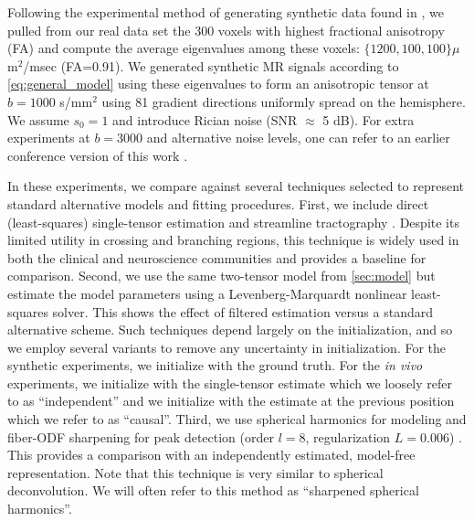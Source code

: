 \documentclass[final,hyperref]{gatech-thesis}
\newcommand{\bn}[1]{\ensuremath{b\!=\!#1}\xspace}
\newcommand{\bone}{\bn{1000}}
\newcommand{\bthree}{\bn{3000}}
\newcommand{\snr}[1]{SNR $\approx$ #1 dB}
\newcommand{\invivo}{\textit{in vivo}\xspace}
\begin{document}
Following the experimental method of generating synthetic data found in
\cite{Tournier2004,Descoteaux2009tmi,Schultz2008}, we pulled from our real
data set the 300 voxels with highest fractional anisotropy (FA) and compute
the average eigenvalues among these voxels:  $\{1200, 100, 100\}\mu$m$^2$/msec
(FA=0.91).  We generated synthetic MR signals according to
\autoref{eq:general_model} using these eigenvalues to form an anisotropic
tensor at \bone s/mm$^2$ using 81 gradient directions uniformly spread on the
hemisphere.  We assume $s_0=1$ and introduce Rician noise (\snr{5}).  For
extra experiments at \bthree and alternative noise levels, one can refer to an
earlier conference version of this work \cite{Malcolm2009ipmi}.

In these experiments, we compare against several techniques selected to
represent standard alternative models and fitting procedures.
%
First, we include direct (least-squares) single-tensor estimation and
streamline tractography \cite{Basser2000}.  Despite its limited utility in
crossing and branching regions, this technique is widely used in both the
clinical and neuroscience communities and provides a baseline for comparison.
%
Second, we use the same two-tensor model from \autoref{sec:model} but estimate
the model parameters using a Levenberg-Marquardt nonlinear least-squares
solver.  This shows the effect of filtered estimation versus a standard
alternative scheme.  Such techniques depend largely on the initialization, and
so we employ several variants to remove any uncertainty in initialization.
For the synthetic experiments, we initialize with the ground truth.  For the
\invivo experiments, we initialize with the single-tensor estimate
\cite{Peled2006} which we loosely refer to as ``independent'' and we
initialize with the estimate at the previous position which we refer to as
``causal''.
%
Third, we use spherical harmonics for modeling and fiber-ODF sharpening for
peak detection (order $l=8$, regularization $L=0.006$)
\cite{Tournier2004,Descoteaux2009tmi}.  This provides a comparison with an
independently estimated, model-free representation.  Note that this technique
is very similar to spherical deconvolution.  We will often refer to this
method as ``sharpened spherical harmonics''.
\end{document}

